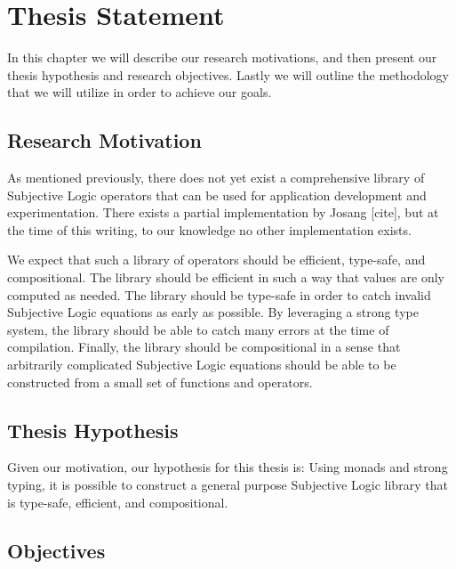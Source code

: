 \documentclass[thesis.tex]{subfiles}
\begin{document}
\chapter{Thesis Statement}
\label{chap:thesis-statement}

In this chapter we will describe our research motivations, and then present our thesis hypothesis and
research objectives. Lastly we will outline the methodology that we will utilize in order to
achieve our goals.


\section{Research Motivation}

As mentioned previously, there does not yet exist a comprehensive library of Subjective
Logic operators that can be used for application development and experimentation. There
exists a partial implementation by Josang [cite], but at the time of this writing, to our
knowledge no other implementation exists.

We expect that such a library of operators should be efficient, type-safe, and compositional.
The library should be efficient in such a way that values are only computed as needed. The
library should be type-safe in order to catch invalid Subjective Logic equations as early as
possible. By leveraging a strong type system, the library should be able to catch many errors
at the time of compilation. Finally, the library should be compositional in a sense that
arbitrarily complicated Subjective Logic equations should be able to be constructed from a
small set of functions and operators.


\section{Thesis Hypothesis}

Given our motivation, our hypothesis for this thesis is: Using monads and strong typing, it is
possible to construct a general purpose Subjective Logic library that is type-safe, efficient,
and compositional.




%
%



\section{Objectives}
\end{document}

